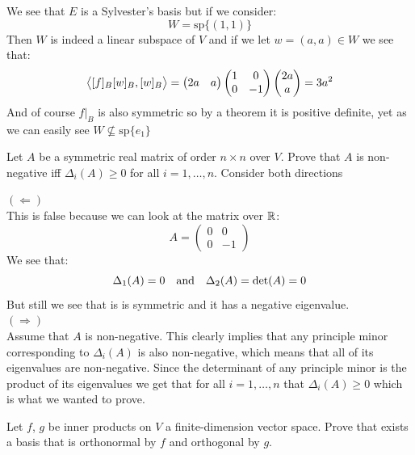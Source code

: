 \documentclass[11pt, a4paper]{article}
\begin{document}
\begin{solution}
\begin{enumerate}
\[  \]
  We see that $E$ is a Sylvester's basis but if we consider:
  \[
    W = \mathrm{sp}\{(1,1)\}
  \]
  Then $W$ is indeed a linear subspace of $V$ and if we let $w=(a,a)\in W$
  we see that:
  \[
    \left\langle [f]_B[w]_B, [w]_B \right\rangle = 
    \begin{pmatrix}
    2a & a
    \end{pmatrix}
    \begin{pmatrix}
      1 & 0 \\
      0 & -1 \\
    \end{pmatrix}
    \begin{pmatrix}
    2a \\ a
    \end{pmatrix} = 3a^2
  \]
  And of course $f\vert_B$ is also symmetric so by a theorem it is 
  positive definite, yet as we can easily see $W \nsubseteq \mathrm{sp}\{e_1\}$
\end{enumerate}
\end{solution}

\begin{exercise}
  Let $A$ be a symmetric real matrix of order $n \times n$ over $V$.
  Prove that $A$ is non-negative iff $\Delta_i(A) \geq 0$ for all 
  $i = 1, \dots, n$. Consider both directions
\end{exercise}
\underline{$(\Leftarrow)$} \\
This is false because we can look at the matrix over $\mathbb{R}$:
\[
A = 
  \begin{pmatrix}
    0 & 0 \\
    0 & -1
  \end{pmatrix}
\]
We see that:
\[
  \Delta_1(A) = 0 \quad \text{and} \quad \Delta_2(A) = \det(A) = 0
\]
But still we see that is is symmetric and it has a negative eigenvalue.
\\
\underline{$(\Rightarrow)$} \\
Assume that $A$ is non-negative. This clearly implies that any principle 
minor corresponding to $\Delta_i(A)$ is also non-negative, which means that
all of its eigenvalues are non-negative. Since the determinant of any
principle minor is the product of its eigenvalues we get that for all
$i = 1,\dots,n$ that $\Delta_i(A) \geq 0$ which is what we wanted to prove.

\begin{exercise}
  Let $f$, $g$ be inner products on $V$ a finite-dimension vector 
  space. Prove that exists a basis that is orthonormal by $f$ and orthogonal 
  by $g$.
\end{exercise}
\end{document}
